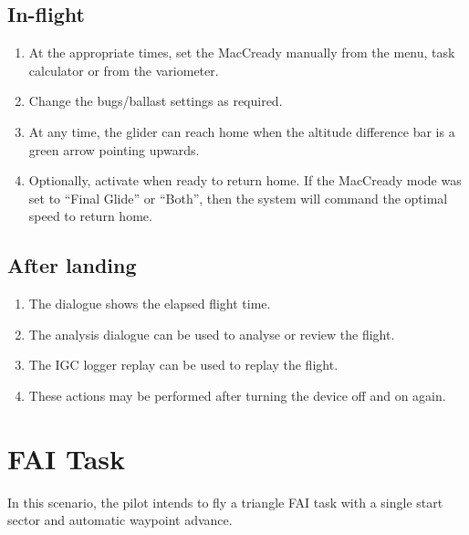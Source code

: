 \subsection*{In-flight}
\begin{enumerate}
\item  At the appropriate times, set the MacCready manually from the menu,
  task calculator or from the variometer.
\item  Change the bugs/ballast settings as required.
\item  At any time, the glider can reach home when the altitude difference
  bar is a green arrow pointing upwards.
\item  Optionally, activate  when ready to return
home. If the MacCready mode was set to ``Final Glide'' or ``Both'', then the
system will command the optimal speed to return home.
\end{enumerate}

\subsection*{After landing}
\begin{enumerate}
\item  The  dialogue shows the elapsed flight time.
\item  The analysis dialogue can be used to analyse or review the flight.
\item  The IGC logger replay can be used to replay the flight.
\item  These actions may be performed after turning the device off and 
  on again. 
\end{enumerate}

\section{FAI Task}\label{sec:fai-task}

In this scenario, the pilot intends to fly a triangle FAI task with a
single start sector and automatic waypoint advance.

